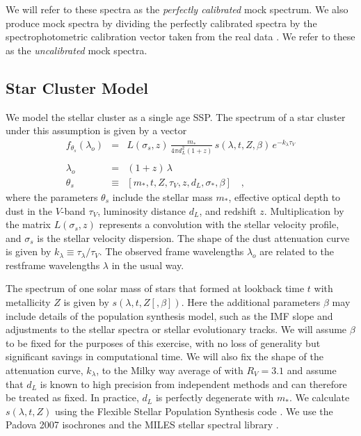 \documentclass[iop,numberedappendix]{emulateapj}
\begin{document}
We will refer to these spectra as the \emph{perfectly calibrated} mock
spectrum. We also produce mock spectra by dividing the perfectly
calibrated spectra by the spectrophotometric calibration vector taken
from the real data \citep[][Fig\ref{fig:ggc_spectrum}]{schiavon05}.
We refer to these as the \emph{uncalibrated} mock spectra.

\subsection{Star Cluster Model}
\label{sec:cluster_model}
We model the stellar cluster as a single age SSP. The spectrum of a
star cluster under this assumption is given by a vector
\begin{eqnarray} \label{eq:StarModel}\displaystyle
f_{\theta_s}(\lambda_o) & = &
L(\sigma_s, z) \, \frac{m_*}{4\pi d_L^2(1+z)} \, s(\lambda, t, Z , \beta) \, e^ {-k_\lambda\tau_V} \\
\nonumber \\ 
\lambda_o & = & (1+z)\,\lambda 
\\
\theta_s & \equiv & \left[ m_*, t, Z, \tau_V, z, d_L, \sigma_*, \beta \right]
\quad ,
\end{eqnarray} where the
parameters $\theta_s$ include 
the stellar mass $m_*$, 
effective optical depth to dust in the $V$-band $\tau_V$, 
luminosity distance $d_L$,
and redshift $z$.
Multiplication by the matrix $L(\sigma_s, z)$ represents a convolution
with the stellar velocity profile,
and $\sigma_s$ is the stellar velocity dispersion. 
The shape of the dust attenuation curve is given by $k_\lambda \equiv
\tau_\lambda/\tau_V$.  
The observed frame wavelengths $\lambda_o$ are related to the
restframe wavelengths $\lambda$ in the usual way.

The spectrum of one solar mass of stars that formed at lookback time
$t$ with metallicity $Z$ is given by $s(\lambda, t, Z [, \beta])$.
Here the additional parameters $\beta$ may include details of the
population synthesis model, such as the IMF slope and adjustments to
the stellar spectra or stellar evolutionary tracks. We will assume
$\beta$ to be fixed for the purposes of this exercise, with no loss of
generality but significant savings in computational time.  We will
also fix the shape of the attenuation curve, $k_\lambda $, to the
Milky way average of \citet{CCM89} with $R_V=3.1$ and assume that
$d_L$ is known to high precision from independent methods and can
therefore be treated as fixed.  In practice, $d_L$ is perfectly
degenerate with $m_*$. We calculate $s(\lambda, t, Z)$ using the
Flexible Stellar Population Synthesis code \citep[FSPS][]{fsps}.  We
use the Padova 2007 isochrones \citep{girardi00, bertelli94, marigo07}
and the MILES stellar spectral library \citep{miles_I, miles_II,
miles_III}.
\end{document}
